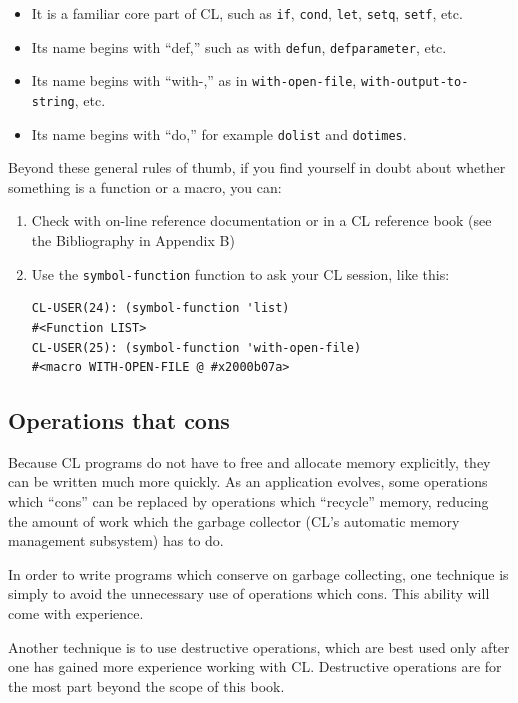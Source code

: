 \begin{itemize}
\item It is a familiar core part of CL, such as \texttt{if}, \texttt{cond}, \texttt{let}, \texttt{setq}, \texttt{setf}, etc.
\item Its name begins with ``def,'' such as with \texttt{defun}, \texttt{defparameter}, etc.
\item Its name begins with ``with-,'' as in \texttt{with-open-file}, \texttt{with-output-to-string}, etc.
\item Its name begins with ``do,'' for example \texttt{dolist} and \texttt{dotimes}.
\end{itemize}

Beyond these general rules of thumb, if you find yourself in doubt about whether something is a function or a macro, you can:

\begin{enumerate}
\item Check with on-line reference documentation or in a CL reference book (see the Bibliography in Appendix B)

\item Use the \texttt{symbol-function} function to ask your CL session, like this:

\begin{verbatim}
CL-USER(24): (symbol-function 'list)
#<Function LIST>
CL-USER(25): (symbol-function 'with-open-file)
#<macro WITH-OPEN-FILE @ #x2000b07a>
\end{verbatim}
\end{enumerate}

\subsection{Operations that cons}

Because CL programs do not have to free and allocate memory explicitly, they can be
written much more quickly. As an application evolves, some operations which ``cons'' can
be replaced by operations which ``recycle'' memory, reducing the amount of work which the
garbage collector (CL's automatic memory management subsystem) has to do.

In order to write programs which conserve on garbage collecting, one technique is simply to avoid the unnecessary use of operations which cons. This ability will come with
experience.

Another technique is to use destructive operations, which are best used only after one
has gained more experience working with CL. Destructive operations are for the most part
beyond the scope of this book.

